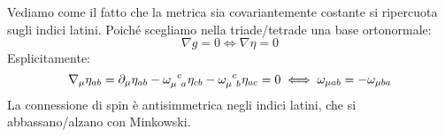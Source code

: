 Vediamo come il fatto che la metrica sia covariantemente costante si ripercuota sugli indici latini. Poiché scegliamo nella triade/tetrade una base ortonormale:
\begin{equation*}
    \nabla g = 0 \iff \nabla \eta = 0
\end{equation*}
Esplicitamente:
\begin{equation*}
    \nabla_\mu \eta_{ab} = \partial_\mu \eta_{ab} - \tensor{\omega}{_\mu^c_a}\eta_{cb}- \tensor{\omega}{_\mu^c_b}\eta_{ac} = 0
    \iff \omega_{\mu a b} = - \omega_{\mu ba}
\end{equation*}
La connessione di spin è antisimmetrica negli indici latini, che si abbassano/alzano con Minkowski.